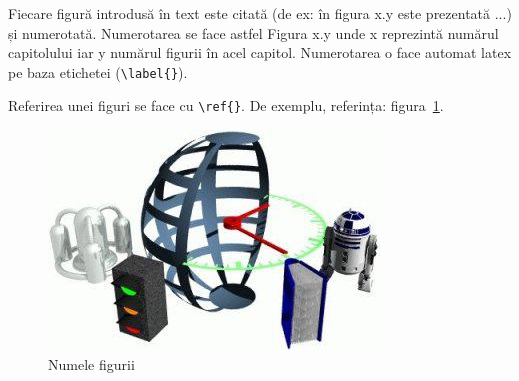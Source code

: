 Fiecare figură introdusă în text este citată (de ex: în figura x.y este prezentată ...) și numerotată.
Numerotarea se face astfel Figura x.y unde x reprezintă numărul capitolului iar y numărul figurii în acel capitol.
Numerotarea o face automat latex pe baza etichetei (\verb+\label{}+).

Referirea unei figuri se face cu \verb+\ref{}+. De exemplu, referința: figura~\ref{fig:imag}.

\begin{figure}[ht]
    \centering
    \includegraphics[]{figs/test.jpg}
    \caption{Numele figurii}
    \label{fig:imag}
\end{figure}

